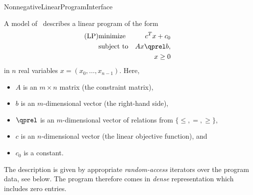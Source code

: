 \begin{ccRefConcept}{NonnegativeLinearProgramInterface}

\ccDefinition
A model of \ccRefName\ describes a linear program of the form
\begin{eqnarray*}
\mbox{(LP)}& \mbox{minimize} & c^{T}x+c_0 \\
&\mbox{subject to}   & Ax\qprel b, \\
&                    & x\geq 0
\end{eqnarray*}
in $n$ real variables $x=(x_0,\ldots,x_{n-1})$.
Here, 
\begin{itemize}
\item $A$ is an $m\times n$ matrix (the constraint matrix), 
\item $b$ is an $m$-dimensional vector (the right-hand side),
\item $\qprel$ is an $m$-dimensional vector of relations 
from $\{\leq, =, \geq\}$, 
\item $c$ is an $n$-dimensional vector (the linear objective
  function), and 
\item $c_0$ is a constant.
\end{itemize}

The description is given by appropriate \emph{random-access} 
iterators over the program data, see below. The program therefore 
comes in \emph{dense} representation which includes zero entries.

\ccHasModels
{}\\
\\


\ccTypes






\end{ccRefConcept}
